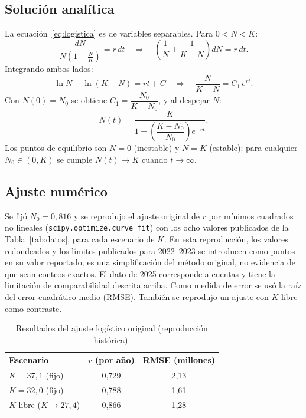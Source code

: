 \documentclass[12pt,a4paper]{article}
\begin{document}
\subsection{Soluci\'on anal\'itica}
La ecuaci\'on~\eqref{eq:logistica} es de variables separables. Para $0<N<K$:
\[
  \frac{dN}{N\left(1-\frac{N}{K}\right)} = r\,dt
  \quad\Longrightarrow\quad
  \left(\frac{1}{N}+\frac{1}{K-N}\right)dN = r\,dt .
\]
Integrando ambos lados:
\[
  \ln N - \ln (K-N) = rt + C
  \quad\Longrightarrow\quad
  \frac{N}{K-N} = C_1\,e^{rt}.
\]
Con $N(0)=N_0$ se obtiene $C_1 = \dfrac{N_0}{K-N_0}$, y al despejar $N$:
\begin{equation}
  N(t)=\frac{K}{1+\left(\dfrac{K-N_0}{N_0}\right)e^{-rt}} .
  \label{eq:solucion}
\end{equation}
Los puntos de equilibrio son $N=0$ (inestable) y $N=K$ (estable): para cualquier $N_0\in(0,K)$ se cumple $N(t)\to K$ cuando $t\to\infty$.

\subsection{Ajuste num\'erico}
Se fij\'o $N_0=0{,}816$ y se reprodujo el ajuste original de $r$ por m\'inimos cuadrados no lineales (\texttt{scipy.optimize.curve\_fit}) con los ocho valores publicados de la Tabla~\ref{tab:datos}, para cada escenario de $K$. En esta reproducci\'on, los valores redondeados y los l\'imites publicados para 2022--2023 se introducen como puntos en su valor reportado; es una simplificaci\'on del m\'etodo original, no evidencia de que sean conteos exactos. El dato de 2025 corresponde a cuentas y tiene la limitaci\'on de comparabilidad descrita arriba. Como medida de error se us\'o la ra\'iz del error cuadr\'atico medio (RMSE). Tambi\'en se reprodujo un ajuste con $K$ libre como contraste.

\begin{table}[h]
\centering
\caption{Resultados del ajuste log\'istico original (reproducci\'on hist\'orica).}
\label{tab:ajuste}
\begin{tabular}{lcc}
\toprule
Escenario & $r$ (por a\~no) & RMSE (millones) \\
\midrule
$K=37{,}1$ (fijo)  & 0{,}729 & 2{,}13 \\
$K=32{,}0$ (fijo)  & 0{,}788 & 1{,}61 \\
$K$ libre ($K\to 27{,}4$) & 0{,}866 & 1{,}28 \\
\bottomrule
\end{tabular}
\end{table}
\end{document}
